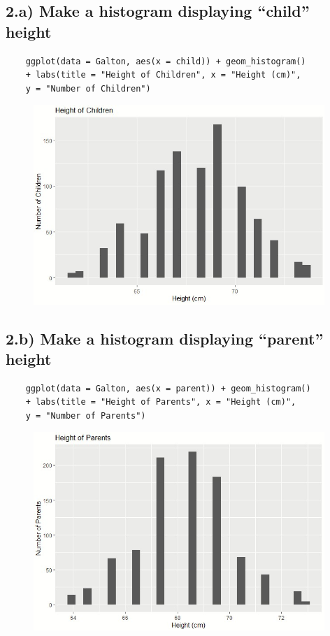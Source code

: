 \documentclass[11pt]{article}
\begin{document}
\subsection*{2.a) Make a histogram displaying “child” height}
\begin{verbatim}
    ggplot(data = Galton, aes(x = child)) + geom_histogram() 
    + labs(title = "Height of Children", x = "Height (cm)", 
    y = "Number of Children")
\end{verbatim}

\begin{figure}[h]
\includegraphics[width = 11cm]{2a.jpg}
\centering
\end{figure}

\subsection*{2.b) Make a histogram displaying “parent” height}
\begin{verbatim}
    ggplot(data = Galton, aes(x = parent)) + geom_histogram() 
    + labs(title = "Height of Parents", x = "Height (cm)",
    y = "Number of Parents")
\end{verbatim}

\begin{figure}[h]
\includegraphics[width = 11cm]{2b.jpg}
\centering
\end{figure}
\end{document}
